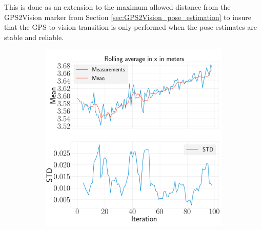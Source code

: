 \documentclass[../Head/report.tex]{subfiles}
\begin{document}
This is done as an extension to the maximum allowed distance from the GPS2Vision marker from Section \ref{sec:GPS2Vision_pose_estimation} to insure that the GPS to vision transition is only performed when the pose estimates are stable and reliable. 

\begin{figure}[H]
    \centering
    \begin{subfigure}[t]{.30\textwidth}
        \centering
        \includegraphics[width=\textwidth]{../Figures/analyse_rolling_average/test1/Calculated_rolling_average_in_x_with_mean_and_STD.png}
        \caption{}
        \label{fig:rolling_average_in_x_test1}
    \end{subfigure}
     \hspace{0.2em}
    \begin{subfigure}[t]{.30\textwidth}
        \centering

\end{subfigure}
\end{figure}
\end{document}

